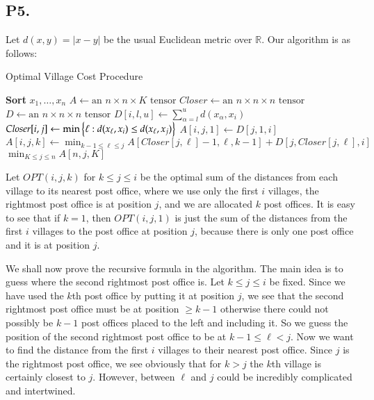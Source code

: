 \documentclass[12pt]{article}
\theoremstyle{definitionstyle}
\def\mbb#1{\mathbb{#1}}
\def \R{\mbb{R}}
\newcommand{\SET}[1]{\Set{\mskip-\medmuskip #1 \mskip-\medmuskip}}
\begin{document}
    \subsection*{P5.}
    Let $d(x,y) = |x-y|$ be the usual Euclidean metric over $\R$. Our algorithm is as follows:
    \begin{algorithm}
        \caption{Optimal Village Cost Procedure}
        \begin{algorithmic} %
                \State \textbf{Sort} $x_1, \ldots, x_n$
                \State $A \gets \text{an } n \times n \times K \text{ tensor}$
                \State $Closer \gets \text{an } n \times n \times n \text{ tensor}$
                \State $D \gets \text{an } n \times n \times n \text{ tensor}$
                        \State $D[i, l,u] \gets \displaystyle \sum_{\alpha=l}^u d(x_\alpha, x_i)$
                    \EndFor
                \EndFor
                    \State $Closer[i,j] \gets \displaystyle \min\SET{\ell : d(x_\ell,x_i) \leq d(x_\ell, x_j)}$
                \EndFor
                    \State $A[i,j,1] \gets D[j, 1, i]$
                \EndFor
                        \State $A[i,j,k] \gets \displaystyle \min_{k-1\leq \ell \leq j} A[Closer[j,\ell]-1, \ell,k-1] + D[j, Closer[j,\ell], i]$
                    \EndFor
                \EndFor
                \State \Return $\displaystyle \min_{K \leq j \leq n} A[n,j,K]$
            \EndProcedure
        \end{algorithmic}
    \end{algorithm}

    Let $OPT(i,j,k)$ for $k \leq j \leq i$ be the optimal sum of the distances from each village to its nearest post office, where we use only the first $i$ villages, the rightmost post office is at position $j$, and we are allocated $k$ post offices. It is easy to see that if $k=1$, then $OPT(i,j,1)$ is just the sum of the distances from the first $i$ villages to the post office at position $j$, because there is only one post office and it is at position $j$. 

    We shall now prove the recursive formula in the algorithm. The main idea is to guess where the second rightmost post office is. Let $k \leq j \leq i$ be fixed. Since we have used the $k$th post office by putting it at position $j$, we see that the second rightmost post office must be at position $\geq k-1$ otherwise there could not possibly be $k-1$ post offices placed to the left and including it. So we guess the position of the second rightmost post office to be at $k-1 \leq \ell < j$. Now we want to find the distance from the first $i$ villages to their nearest post office. Since $j$ is the rightmost post office, we see obviously that for $k > j$ the $k$th village is certainly closest to $j$. However, between $\ell$ and $j$ could be incredibly complicated and intertwined.
\end{document}
